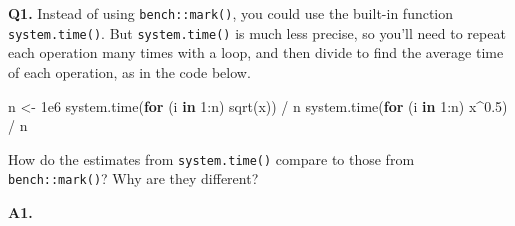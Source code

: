 \documentclass[
]{book}
\newenvironment{Shaded}{\begin{snugshade}}{\end{snugshade}}
\newcommand{\ControlFlowTok}[1]{\textcolor[rgb]{0.13,0.29,0.53}{\textbf{#1}}}
\newcommand{\DecValTok}[1]{\textcolor[rgb]{0.00,0.00,0.81}{#1}}
\newcommand{\FloatTok}[1]{\textcolor[rgb]{0.00,0.00,0.81}{#1}}
\newcommand{\FunctionTok}[1]{\textcolor[rgb]{0.00,0.00,0.00}{#1}}
\newcommand{\NormalTok}[1]{#1}
\newcommand{\OtherTok}[1]{\textcolor[rgb]{0.56,0.35,0.01}{#1}}
\newcommand{\SpecialCharTok}[1]{\textcolor[rgb]{0.00,0.00,0.00}{#1}}
\begin{document}
\textbf{Q1.} Instead of using \texttt{bench::mark()}, you could use the built-in function \texttt{system.time()}. But \texttt{system.time()} is much less precise, so you'll need to repeat each operation many times with a loop, and then divide to find the average time of each operation, as in the code below.

\begin{Shaded}
\begin{Highlighting}[]
\NormalTok{n }\OtherTok{\textless{}{-}} \FloatTok{1e6}
\FunctionTok{system.time}\NormalTok{(}\ControlFlowTok{for}\NormalTok{ (i }\ControlFlowTok{in} \DecValTok{1}\SpecialCharTok{:}\NormalTok{n) }\FunctionTok{sqrt}\NormalTok{(x)) }\SpecialCharTok{/}\NormalTok{ n}
\FunctionTok{system.time}\NormalTok{(}\ControlFlowTok{for}\NormalTok{ (i }\ControlFlowTok{in} \DecValTok{1}\SpecialCharTok{:}\NormalTok{n) x}\SpecialCharTok{\^{}}\FloatTok{0.5}\NormalTok{) }\SpecialCharTok{/}\NormalTok{ n}
\end{Highlighting}
\end{Shaded}

How do the estimates from \texttt{system.time()} compare to those from \texttt{bench::mark()}? Why are they different?

\textbf{A1.}
\end{document}
